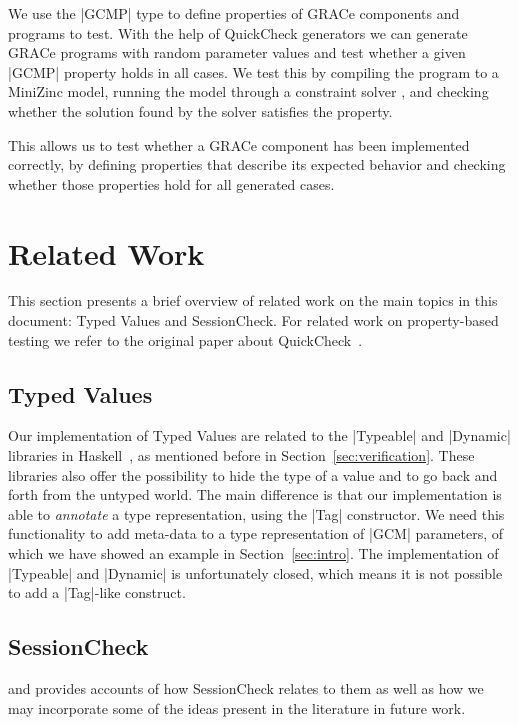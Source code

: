 \documentclass{article}
\begin{document}
We use the |GCMP| type to define properties of GRACe components and programs to
test.
%
With the help of QuickCheck generators we can generate GRACe programs with
random parameter values and test whether a given |GCMP| property holds in all
cases.
%
We test this by compiling the program to a MiniZinc model, running the model through
a constraint solver , and checking whether
the solution found by the solver satisfies the property.

This allows us to test whether a GRACe component has been implemented correctly,
by defining properties that describe its expected behavior and checking whether
those properties hold for all generated cases.



\section{Related Work}

This section presents a brief overview of related work on the main topics in this
document: Typed Values and SessionCheck. For related work on property-based
testing we refer to the original paper about QuickCheck~\cite{QuickCheck}.

\subsection{Typed Values}

Our implementation of Typed Values are related to the |Typeable| and |Dynamic|
libraries in Haskell~\cite{DataDynamic}, as mentioned before in
Section~\ref{sec:verification}. These libraries also offer the possibility to
hide the type of a value and to go back and forth from the untyped world. The
main difference is that our implementation is able to \emph{annotate} a type
representation, using the |Tag| constructor. We need this functionality to add
meta-data to a type representation of |GCM| parameters, of which we have showed an
example in Section~\ref{sec:intro}. The implementation of |Typeable| and
|Dynamic| is unfortunately closed, which means it is not possible to add a
|Tag|-like construct.


\subsection{SessionCheck}
and provides accounts
of how SessionCheck relates to them as well as how we may incorporate some of
the ideas present in the literature in future work.
\end{document}
